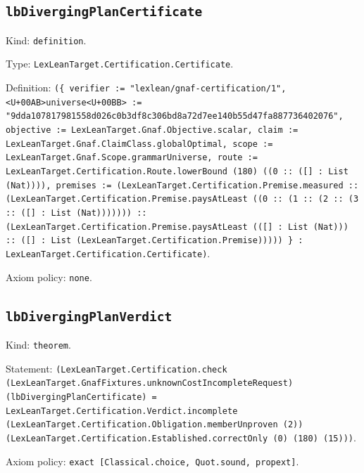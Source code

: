 \documentclass[11pt]{article}
\begin{document}
\subsection*{\texttt{lbDivergingPlanCertificate}}
\noindent Kind: \texttt{definition}.\par
\noindent Type: \texttt{LexLeanTarget.Certification.Certificate}.\par
\noindent Definition: \texttt{(\{ verifier := "lexlean/gnaf-certification/1", <U+00AB>universe<U+00BB> := "9dda107817981558d026c0b3df8c306bd8a72d7ee140b55d47fa887736402076", objective := LexLeanTarget.Gnaf.Objective.scalar, claim := LexLeanTarget.Gnaf.ClaimClass.globalOptimal, scope := LexLeanTarget.Gnaf.Scope.grammarUniverse, route := LexLeanTarget.Certification.Route.lowerBound (180) ((0 :: ([] : List (Nat)))), premises := (LexLeanTarget.Certification.Premise.measured :: (LexLeanTarget.Certification.Premise.paysAtLeast ((0 :: (1 :: (2 :: (3 :: ([] : List (Nat))))))) :: (LexLeanTarget.Certification.Premise.paysAtLeast (([] : List (Nat))) :: ([] : List (LexLeanTarget.Certification.Premise))))) \} : LexLeanTarget.Certification.Certificate)}.\par
\noindent Axiom policy: \texttt{none}.\par
\subsection*{\texttt{lbDivergingPlanVerdict}}
\noindent Kind: \texttt{theorem}.\par
\noindent Statement: \texttt{(LexLeanTarget.Certification.check (LexLeanTarget.GnafFixtures.unknownCostIncompleteRequest) (lbDivergingPlanCertificate) = LexLeanTarget.Certification.Verdict.incomplete (LexLeanTarget.Certification.Obligation.memberUnproven (2)) (LexLeanTarget.Certification.Established.correctOnly (0) (180) (15)))}.\par
\noindent Axiom policy: \texttt{exact [Classical.choice, Quot.sound, propext]}.\par
\end{document}
